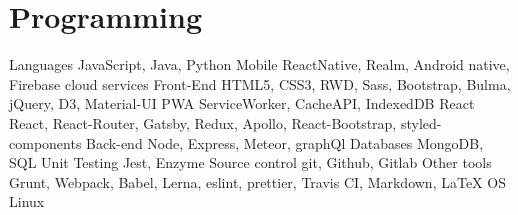 \documentclass[letterpaper]{twentysecondcv} %
\begin{document}

\section{Programming}
\begin{twentyshort} %
    \twentyitemshort
    	{Languages}
    	{JavaScript, Java, Python}
    \twentyitemshort
    	{Mobile}
        {ReactNative, Realm, Android native, Firebase cloud services}
    \twentyitemshort
    	{Front-End}
        {HTML5, CSS3, RWD, Sass, Bootstrap, Bulma, jQuery, D3, Material-UI}
    \twentyitemshort
    	{PWA}
        {ServiceWorker, CacheAPI, IndexedDB}
     \twentyitemshort
    	{React}
		{React, React-Router, Gatsby, Redux, Apollo, React-Bootstrap, styled-components}
     \twentyitemshort
    	{Back-end}
		{Node, Express, Meteor, graphQl}
     \twentyitemshort
    	{Databases}
		{MongoDB, SQL}
     \twentyitemshort
    	{Unit Testing}
		{Jest, Enzyme}
     \twentyitemshort
    	{Source control}
		{git, Github, Gitlab}
     \twentyitemshort
    	{Other tools}
		{Grunt, Webpack, Babel, Lerna, eslint, prettier, Travis CI, Markdown, \LaTeX}
    \twentyitemshort
    	{OS}
		{Linux}
\end{twentyshort}

%
\end{document}
